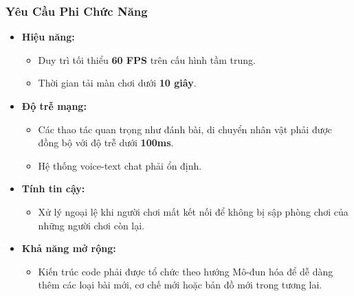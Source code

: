 \begin{frame}
\frametitle{Yêu Cầu Phi Chức Năng}
\begin{itemize}
    \item \textbf{Hiệu năng:}
    \begin{itemize}
        \item Duy trì tối thiểu \textbf{60 FPS} trên cấu hình tầm trung.
        \item Thời gian tải màn chơi dưới \textbf{10 giây}.
    \end{itemize}
    \item \textbf{Độ trễ mạng:}
    \begin{itemize}
        \item Các thao tác quan trọng như đánh bài, di chuyển nhân vật phải được đồng bộ với độ trễ dưới \textbf{100ms}.
        \item Hệ thống voice-text chat phải ổn định.
    \end{itemize}
    \item \textbf{Tính tin cậy:}
    \begin{itemize}
        \item Xử lý ngoại lệ khi người chơi mất kết nối để không bị sập phòng chơi của những người chơi còn lại.
    \end{itemize}
    \item \textbf{Khả năng mở rộng:}
    \begin{itemize}
        \item Kiến trúc code phải được tổ chức theo hướng Mô-đun hóa để dễ dàng thêm các loại bài mới, cơ chế mới hoặc bản đồ mới trong tương lai.
    \end{itemize}
\end{itemize}
\end{frame}


